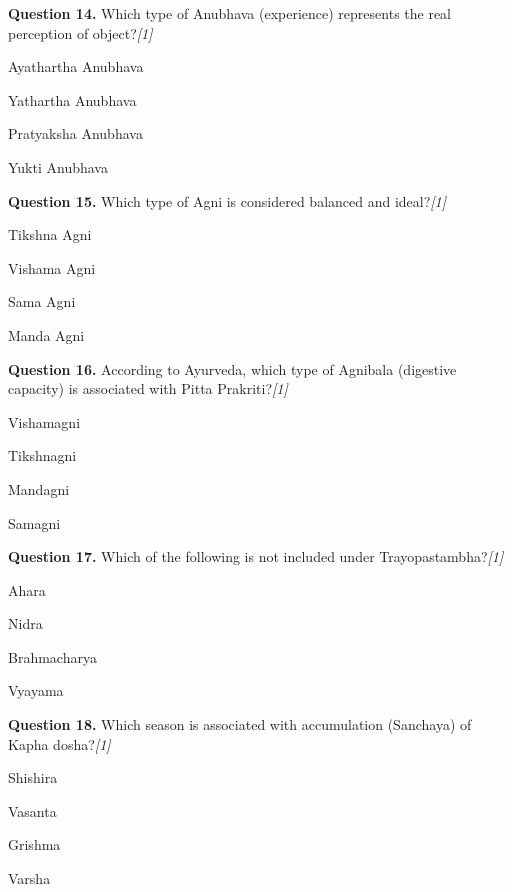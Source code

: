 \documentclass[11pt,a4paper]{article}
\newcommand{\pts}[1]{\hfill   \textit{[#1]}}
\begin{document}
\medskip


\noindent   \textbf{Question 14.} Which type of Anubhava (experience) represents the real perception of object?\pts{1}

\begin{parts}
  \item Ayathartha Anubhava
  \item Yathartha Anubhava
  \item Pratyaksha Anubhava
  \item Yukti Anubhava
\end{parts}

\medskip


\noindent   \textbf{Question 15.} Which type of Agni is considered balanced and ideal?\pts{1}

\begin{parts}
  \item Tikshna Agni
  \item Vishama Agni
  \item Sama Agni
  \item Manda Agni
\end{parts}

\medskip


\noindent   \textbf{Question 16.} According to Ayurveda, which type of Agnibala (digestive capacity) is associated with Pitta Prakriti?\pts{1}

\begin{parts}
  \item Vishamagni
  \item Tikshnagni
  \item Mandagni
  \item Samagni
\end{parts}

\medskip


\noindent   \textbf{Question 17.} Which of the following is not included under Trayopastambha?\pts{1}

\begin{parts}
  \item Ahara
  \item Nidra
  \item Brahmacharya
  \item Vyayama
\end{parts}

\medskip


\noindent   \textbf{Question 18.} Which season is associated with accumulation (Sanchaya) of Kapha dosha?\pts{1}

\begin{parts}
  \item Shishira
  \item Vasanta
  \item Grishma
  \item Varsha
\end{parts}
\end{document}
